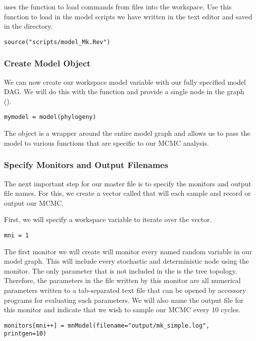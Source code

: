 \RevBayes uses the  function to load commands from \Rev files into the workspace.
Use this function to load in the model scripts we have written in the text editor and saved in the  directory.
{\tt \begin{snugshade*}
\begin{lstlisting}
source("scripts/model_Mk.Rev")

\end{lstlisting}
\end{snugshade*}}


\medskip
\subsubsection{Create Model Object}\label{subsub:Exercise-ModObj}

We can now create our workspace model variable with our fully specified model DAG. 
We will do this with the  function and provide a single node in the graph ().
{\tt \begin{snugshade*}
\begin{lstlisting}
mymodel = model(phylogeny)
\end{lstlisting}
\end{snugshade*}}

The object  is a wrapper around the entire model graph and allows us to pass the model to various functions that are specific to our MCMC analysis.

\medskip
\subsubsection{Specify Monitors and Output Filenames}\label{subsub:Exercise-Monitors}

The next important step for our master \Rev file is to specify the monitors and output file names.
For this, we create a vector called  that will each sample and record or output our MCMC. 

First, we will specify a workspace variable to iterate over the  vector.
{\tt \begin{snugshade*}
\begin{lstlisting}
mni = 1
\end{lstlisting}
\end{snugshade*}}

The first monitor we will create will monitor every named random variable in our model graph. 
This will include every stochastic and deterministic node using the  monitor.
The only parameter that is not included in the  is the tree topology. 
Therefore, the parameters in the file written by this monitor are all numerical parameters written to a tab-separated text file that can be opened by accessory programs for evaluating such parameters.
We will also name the output file for this monitor and indicate that we wish to sample our MCMC every 10 cycles.
{\tt \begin{snugshade*}
\begin{lstlisting}
monitors[mni++] = mnModel(filename="output/mk_simple.log", printgen=10)
\end{lstlisting}
\end{snugshade*}}

